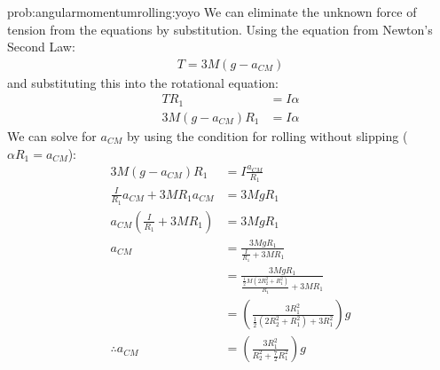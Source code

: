 \begin{solution}{prob:angularmomentumrolling:yoyo}
We can eliminate the unknown force of tension from the equations by substitution. Using the equation from Newton's Second Law:
\begin{align*}
T=3M (g-a_{CM})
\end{align*}
and substituting this into the rotational equation:
\begin{align*}
TR_1 &= I\alpha\\
3M (g-a_{CM}) R_1 &=  I\alpha
\end{align*}
We can solve for $a_{CM}$ by using the condition for rolling without slipping ($\alpha R_1 = a_{CM}$):
\begin{align*}
3M (g-a_{CM}) R_1 &=  I\frac{a_{CM}}{R_1}\\
\frac{I}{R_1}a_{CM}+3MR_1a_{CM}&= 3MgR_1\\
a_{CM}\left(\frac{I}{R_1}+3MR_1\right)&= 3MgR_1\\
a_{CM}&=\frac{3MgR_1}{\frac{I}{R_1}+3MR_1}\\
&=\frac{3MgR_1}{\frac{\frac{1}{2}M(2R_2^2+R_1^2)}{R_1}+3MR_1}\\
&=\left(\frac{3R_1^2}{\frac{1}{2}(2R_2^2+R_1^2)+3R_1^2}\right)g\\
\therefore a_{CM}&=\left( \frac{3R_1^2}{R_2^2+\frac{7}{2}R_1^2}\right)g
\end{align*}

\end{solution}



